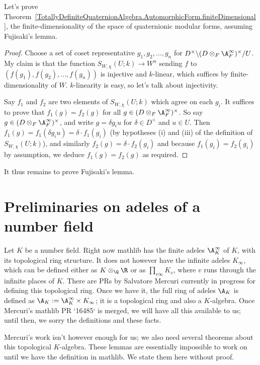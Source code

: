 Let's prove Theorem~\ref{TotallyDefiniteQuaternionAlgebra.AutomorphicForm.finiteDimensional},
the finite-dimensionality of the space of quaternionic modular forms,
assuming Fujisaki's lemma.
\begin{proof}
  Choose a set of coset representative $g_1,g_2,\ldots,g_n$ for
  $D^\times\backslash(D\otimes_F\A_F^\infty)^\times/U$. My claim is that
  the function $S_{W,\chi}(U;k)\to W^n$ sending $f$ to $(f(g_1),f(g_2),\ldots,f(g_n))$
  is injective and $k$-linear, which suffices by finite-dimensionality of $W$.
  $k$-linearity is easy, so let's talk about injectivity.

  Say $f_1$ and $f_2$ are two elements of $S_{W,\chi}(U;k)$ which agree on
  each $g_i$. It suffices to prove that $f_1(g)=f_2(g)$ for all
  $g\in(D\otimes_F\A_F^\infty)^\times$. So say $g\in(D\otimes_F\A_F^\infty)^\times$,
  and write $g=\delta g_iu$ for $\delta \in D^\times$ and $u\in U$.
  Then $f_1(g)=f_1(\delta g_iu)=\delta\cdot f_1(g_i)$ (by hypotheses (i) and (iii)
  of the definition of $S_{W,\chi}(U;k)$), and similarly $f_2(g)=\delta\cdot f_2(g_i)$
  and because $f_1(g_i)=f_2(g_i)$ by assumption, we deduce $f_1(g)=f_2(g)$ as required.
\end{proof}

It thus remains to prove Fujisaki's lemma.

\section{Preliminaries on adeles of a number field}

Let $K$ be a number field. Right now mathlib has the finite adeles $\A_K^\infty$ of $K$,
with its topological ring structure. It does not however have the infinite adeles $K_\infty$,
which can be defined either as $K\otimes_{\Q}\R$ or as $\prod_{v\infty}K_v$, where
$v$ runs through the infinite places of $K$. There are PRs by Salvatore Mercuri currently
in progress for defining this topological ring. Once we have it, the full ring of
adeles $\A_K$ is defined as $\A_K:=\A_K^\infty\times K_\infty$; it is a topological ring
and also a $K$-algebra. Once Mercuri's mathlib PR `16485` is merged, we will have
all this available to us; until then, we sorry the definitions and these facts.

Mercuri's work isn't however enough for us; we also need several theorems about this topological
$K$-algebra. These lemmas are essentially impossible to work on until we have the definition in
mathlib. We state them here without proof.

